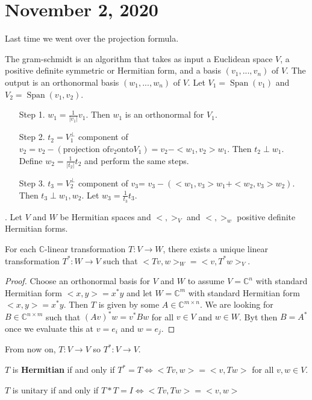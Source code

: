 \documentclass{article}
\newcommand{\vocab}[1]{\textbf{\color{blue!90}\boldmath #1}}
\newcommand{\C}{\mathbb{C}}
\newcommand{\ra}[1][]{\xrightarrow{#1}}
\DeclareMathOperator{\Span}{Span}
\begin{document}
\section{November 2, 2020}
Last time we went over the projection formula. 
\begin{definition}
The gram-schmidt is an algorithm that takes as input a Euclidean space $V$, a positive definite symmetric or Hermitian form, and a basis $(v_1,...,v_n)$ of $V$. The output is an orthonormal basis $(w_1,...,w_n)$ of $V$. Let $V_1=\Span(v_1)$ and $V_2=\Span(v_1,v_2)$.
\end{definition}
\begin{enumerate}
    \item[Step 1.] $w_1=\frac{1}{|v_1|}v_1$. Then $w_1$ is an orthonormal for $V_1$. 
    \item[Step 2.] $t_2=V_1^\perp$ component of $v_2=v_2-(\textrm{projection of} v_2 \textrm{onto} V_1)=v_2-<w_1,v_2>w_1$. Then $t_2\perp w_1$. Define $w_2=\frac{1}{|t_2|}t_2$ and perform the same steps. 
    \item[Step 3.] $t_3=V_2^\perp$ component of $v_3$= $v_3-(<w_1,v_3>w_1+<w_2,v_3>w_2)$. Then $t_3\perp w_1,w_2$. Let $w_3=\frac{1}{t_3}t_3$.
\end{enumerate}.
Let $V$ and $W$ be Hermitian spaces and $<,>_V$ and $<,>_w$ positive definite Hermitian forms.
\begin{proposition}
For each $\C$-linear transformation $T:V\ra W$, there exists a unique linear transformation $T^*:W\ra V$ such that $<Tv,w>_W=<v,T^*w>_V$.
\end{proposition}
\begin{proof}
Choose an orthonormal basis for $V$ and $W$ to assume $V=\C^n$ with standard Hermitian form $<x,y>=x^*y$ and let $W=\C^m$ with standard Hermitian form $<x,y>=x^*y$. Then $T$ is given by some $A\in \C^{m\times n}$. We are looking for $B\in \C^{n\times m}$ such that $(Av)^*w=v^*Bw$ for all $v\in V$ and $w\in W$. Byt then $B=A^*$ once we evaluate this at $v=e_i$ and $w=e_j$.
\end{proof}
From now on, $T:V\ra V$ so $T^*:V\ra V$.
\begin{definition}
$T$ is \vocab{Hermitian} if and only if $T^*=T\iff <Tv,w>=<v,Tw>$ for all $v,w\in V$.
\end{definition}
\begin{definition}
$T$ is unitary if and only if $T*T=I\iff <Tv,Tw>=<v,w>$
\end{definition}
\end{document}
